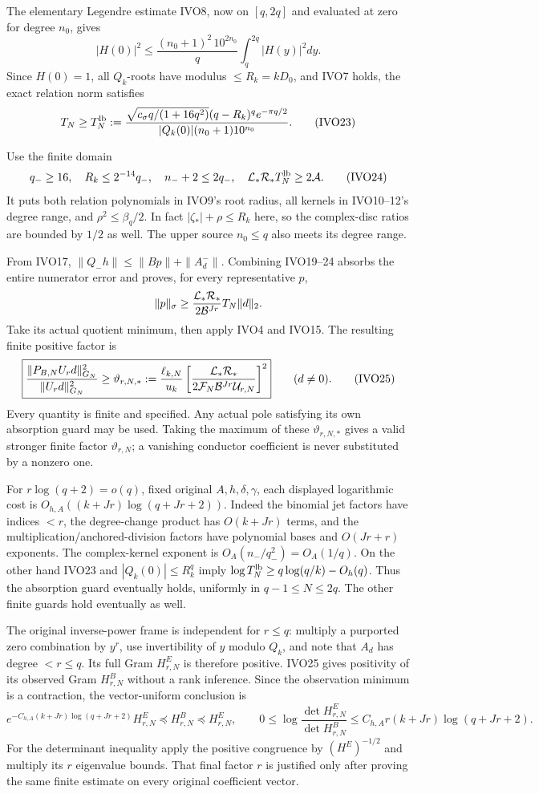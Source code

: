The elementary Legendre estimate IVO8, now on \([q,2q]\) and evaluated at zero for degree \(n_0\), gives \[
|H(0)|^2\le\frac{(n_0+1)^2\,10^{2n_0}}q\int_q^{2q}|H(y)|^2dy.
\] Since \(H(0)=1\), all \(Q_k\)-roots have modulus \(\le R_k=kD_0\), and IVO7 holds, the exact relation norm satisfies \[
T_N\ge T_N^{\rm lb}:=
\frac{\sqrt{c_\sigma q/(1+16q^2)}(q-R_k)^q e^{-\pi q/2}}
{|Q_k(0)|(n_0+1)10^{n_0}}.
\tag{IVO23}
\]

Use the finite domain \[
q_-\ge16,\quad R_k\le2^{-14}q_-,\quad
n_-+2\le2q_-,\quad
{\cal L}_*{\cal R}_*T_N^{\rm lb}\ge2{\cal A}.
\tag{IVO24}
\] It puts both relation polynomials in IVO9's root radius, all kernels in IVO10--12's degree range, and \(\rho^2\le\beta_q/2\). In fact \(|\zeta_*|+\rho\le R_k\) here, so the complex-disc ratios are bounded by \(1/2\) as well. The upper source \(n_0\le q\) also meets its degree range.

From IVO17, \(\|Q_-h\|\le\|Bp\|+\|A_d^-\|\). Combining IVO19--24 absorbs the entire numerator error and proves, for every representative \(p\), \[
\|p\|_\sigma\ge
\frac{{\cal L}_*{\cal R}_*}{2{\cal B}^{Jr}}T_N\|d\|_2.
\] Take its actual quotient minimum, then apply IVO4 and IVO15. The resulting finite positive factor is \[
\boxed{
\frac{\|P_{B,N}U_rd\|_{G_N}^2}{\|U_rd\|_{G_N}^2}
\ge\vartheta_{r,N,*}:=
\frac{\ell_{k,N}}{u_k}
\left[\frac{{\cal L}_*{\cal R}_*}
{2{\cal F}_N{\cal B}^{Jr}{\cal U}_{r,N}}\right]^2
}\qquad(d\ne0).
\tag{IVO25}
\] Every quantity is finite and specified. Any actual pole satisfying its own absorption guard may be used. Taking the maximum of these \(\vartheta_{r,N,*}\) gives a valid stronger finite factor \(\vartheta_{r,N}\); a vanishing conductor coefficient is never substituted by a nonzero one.

For \(r\log(q+2)=o(q)\), fixed original \(A,h,\delta,\gamma\), each displayed logarithmic cost is \(O_{h,A}((k+Jr)\log(q+Jr+2))\). Indeed the binomial jet factors have indices \(<r\), the degree-change product has \(O(k+Jr)\) terms, and the multiplication/anchored-division factors have polynomial bases and \(O(Jr+r)\) exponents. The complex-kernel exponent is \(O_A(n_-/q_-^2)=O_A(1/q)\). On the other hand IVO23 and \(|Q_k(0)|\le R_k^q\) imply \(\log T_N^{\rm lb}\ge q\log(q/k)-O_h(q)\). Thus the absorption guard eventually holds, uniformly in \(q-1\le N\le2q\). The other finite guards hold eventually as well.

The original inverse-power frame is independent for \(r\le q\): multiply a purported zero combination by \(y^r\), use invertibility of \(y\) modulo \(Q_k\), and note that \(A_d\) has degree \(<r\le q\). Its full Gram \(H^E_{r,N}\) is therefore positive. IVO25 gives positivity of its observed Gram \(H^B_{r,N}\) without a rank inference. Since the observation minimum is a contraction, the vector-uniform conclusion is \[
\boxed{
e^{-C_{h,A}(k+Jr)\log(q+Jr+2)}H^E_{r,N}
\preceq H^B_{r,N}\preceq H^E_{r,N},\qquad
0\le\log\frac{\det H^E_{r,N}}{\det H^B_{r,N}}
\le C_{h,A}r(k+Jr)\log(q+Jr+2).
}\tag{IVO26}
\] For the determinant inequality apply the positive congruence by \((H^E)^{-1/2}\) and multiply its \(r\) eigenvalue bounds. That final factor \(r\) is justified only after proving the same finite estimate on every original coefficient vector.

